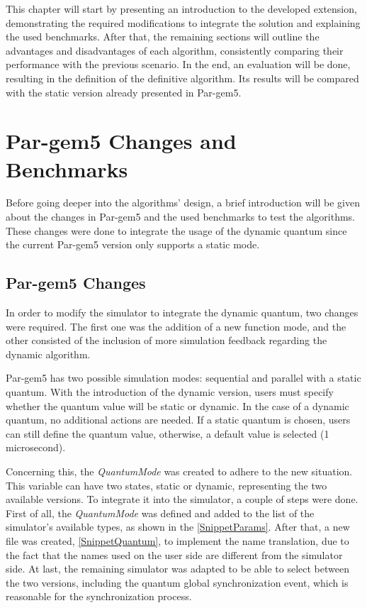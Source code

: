 This chapter will start by presenting an introduction to the developed extension, demonstrating the required modifications to integrate the solution and 
explaining the used benchmarks. 
After that, the remaining sections will outline the advantages and disadvantages of each algorithm, consistently comparing their performance with the 
previous scenario. In the end, an evaluation will be done, resulting in the definition of the definitive algorithm. Its results will be compared with 
the static version already presented in Par-gem5.


\section{Par-gem5 Changes and Benchmarks}


Before going deeper into the algorithms' design, a brief introduction will be given about the changes in Par-gem5 and the used benchmarks to test the 
algorithms. These changes were done to integrate the usage of the dynamic quantum since the current Par-gem5 version only supports a static mode. 

\subsection{Par-gem5 Changes}

In order to modify the simulator to integrate the dynamic quantum, two changes were required. 
The first one was the addition of a new function mode, and the other consisted of the inclusion of more simulation feedback regarding 
the dynamic algorithm. 

Par-gem5 has two possible simulation modes: sequential and parallel with a static quantum. With the introduction of the dynamic version, 
users must specify whether the quantum value will be static or dynamic. In the case of a dynamic quantum, no additional actions are needed. 
If a static quantum is chosen, users can still define the quantum value, otherwise, a default value is selected (1 microsecond). 

Concerning this, the \textit{QuantumMode} \space was created to adhere to the new situation. This variable can have two states, static or 
dynamic, representing the two available versions. To integrate it into the simulator, a couple of steps were done. 
First of all, the \textit{QuantumMode} was defined and added to the list of the simulator's available types, as shown in the \autoref{SnippetParams}. 
After that, a new file was created, \autoref{SnippetQuantum}, to implement the name translation, due to the fact that the names used on the user 
side are different from the simulator side. At last, the remaining simulator was adapted to be able to select between the two versions, 
including the quantum global synchronization event, which is reasonable for the synchronization process.

